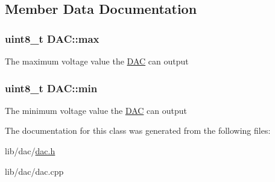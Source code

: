 \subsection{Member Data Documentation}
\hypertarget{class_d_a_c_a229a81d8ebf43511dfb6815c5cd8f425}{
\subsubsection[{max}]{\setlength{\rightskip}{0pt plus 5cm}uint8\-\_\-t D\-A\-C\-::max\hspace{0.3cm}{\ttfamily [private]}}}\label{class_d_a_c_a229a81d8ebf43511dfb6815c5cd8f425}
The maximum voltage value the \hyperlink{class_d_a_c}{D\-A\-C} can output \hypertarget{class_d_a_c_aa4f21cf166374cfc6edcd412f4d2072b}{
\subsubsection[{min}]{\setlength{\rightskip}{0pt plus 5cm}uint8\-\_\-t D\-A\-C\-::min\hspace{0.3cm}{\ttfamily [private]}}}\label{class_d_a_c_aa4f21cf166374cfc6edcd412f4d2072b}
The minimum voltage value the \hyperlink{class_d_a_c}{D\-A\-C} can output 

The documentation for this class was generated from the following files\-:\begin{DoxyCompactItemize}
\item 
lib/dac/\hyperlink{dac_8h}{dac.\-h}\item 
lib/dac/dac.\-cpp\end{DoxyCompactItemize}
